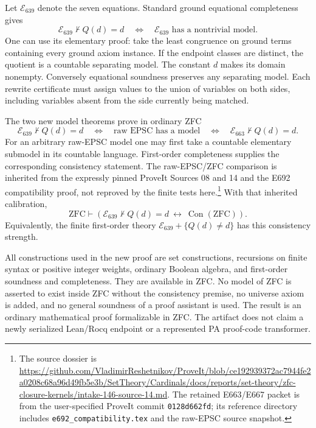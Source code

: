 Let $\mathcal E_{639}$ denote the seven equations.  Standard
ground equational completeness gives
\[
 \mathcal E_{639}\nvdash Q(d)=d
 \quad\Longleftrightarrow\quad
 \mathcal E_{639}\text{ has a nontrivial model}.
\]
One can use its elementary proof: take the least congruence
on ground terms containing every ground axiom instance.  If
the endpoint classes are distinct, the quotient is a countable
separating model.  The constant $d$ makes its domain nonempty.
Conversely equational soundness preserves any separating model.
Each rewrite certificate must assign values to the union of
variables on both sides, including variables absent from the
side currently being matched.

The two new model theorems prove in ordinary ZFC
\begin{equation}
 \mathcal E_{639}\nvdash Q(d)=d
 \quad\Longleftrightarrow\quad
 \text{raw EPSC has a model}
 \quad\Longleftrightarrow\quad
 \mathcal E_{663}\nvdash Q(d)=d.
 \label{eq:e639-relative}
\end{equation}
For an arbitrary raw-EPSC model one may first take a countable
elementary submodel in its countable language.  First-order
completeness supplies the corresponding consistency statement.
The raw-EPSC/ZFC comparison is inherited from the expressly pinned
ProveIt Sources 08 and 14 and the E692 compatibility proof, not
reproved by the finite tests here.\footnote{The source dossier is
\url{https://github.com/VladimirReshetnikov/ProveIt/blob/ce192939372ac7944fe2a0208c68a96d49fb5e3b/SetTheory/Cardinals/docs/reports/set-theory/zfc-closure-kernels/intake-146-source-14.md}.
The retained E663/E667 packet is from the user-specified ProveIt
commit \texttt{0128d662fd}; its reference directory includes
\texttt{e692\_compatibility.tex} and the raw-EPSC source snapshot.}
With that inherited calibration,
\begin{equation}
 \mathrm{ZFC}\vdash
 \left(\mathcal E_{639}\nvdash Q(d)=d
              \ \longleftrightarrow\ \operatorname{Con}(\mathrm{ZFC})\right).
 \label{eq:e639-zfc}
\end{equation}
Equivalently, the finite first-order theory
$\mathcal E_{639}+\{Q(d)\ne d\}$ has this consistency strength.

All constructions used in the new proof are set constructions,
recursions on finite syntax or positive integer weights, ordinary
Boolean algebra, and first-order soundness and completeness.
They are available in ZFC.  No model of ZFC is asserted to exist
inside ZFC without the consistency premise, no universe axiom
is added, and no general soundness of a proof assistant is used.
The result is an ordinary mathematical proof formalizable in ZFC.
The artifact does not claim a newly serialized Lean/Rocq endpoint
or a represented PA proof-code transformer.


